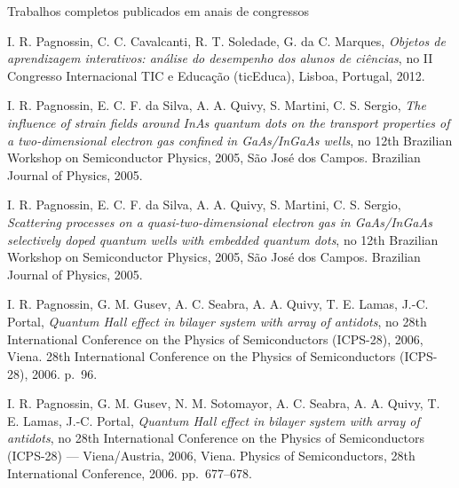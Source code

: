 \begin{compactitem}
	\item Trabalhos completos publicados em anais de congressos
	\begin{compactitem}
		\item I. R. Pagnossin, C. C. Cavalcanti, R. T. Soledade, G. da C. Marques, \textsl{Objetos de aprendizagem interativos: análise do desempenho dos alunos de ciências}, no II Congresso Internacional TIC e Educação (ticEduca), Lisboa, Portugal, 2012.
		\item I. R. Pagnossin, E. C. F. da Silva, A. A. Quivy, S. Martini, C. S. Sergio, \textsl{The influence of strain fields around InAs quantum dots on the transport properties of a two-dimensional electron gas confined in GaAs/InGaAs wells}, no 12th Brazilian Workshop on Semiconductor Physics, 2005, São José dos Campos. Brazilian Journal of Physics, 2005.
		\item I. R. Pagnossin, E. C. F. da Silva, A. A. Quivy, S. Martini, C. S. Sergio, \textsl{Scattering processes on a quasi-two-dimensional electron gas in GaAs/InGaAs selectively doped quantum wells with embedded quantum dots}, no 12th Brazilian Workshop on Semiconductor Physics, 2005, São José dos Campos. Brazilian Journal of Physics, 2005.
		\item I. R. Pagnossin, G. M. Gusev, A. C. Seabra, A. A. Quivy, T. E. Lamas, J.-C. Portal, \textsl{Quantum Hall effect in bilayer system with array of antidots}, no 28th International Conference on the Physics of Semiconductors (ICPS-28), 2006, Viena. 28th International Conference on the Physics of Semiconductors (ICPS-28), 2006. p.~96.
		\item I. R. Pagnossin, G. M. Gusev, N. M. Sotomayor, A. C. Seabra, A. A. Quivy, T. E. Lamas, J.-C. Portal, \textsl{Quantum Hall effect in bilayer system with array of antidots}, no 28th International Conference on the Physics of Semiconductors (ICPS-28) --- Viena/Austria, 2006, Viena. Physics of Semiconductors, 28th International Conference, 2006. pp.~677--678.
	\end{compactitem}
	

\end{compactitem}
